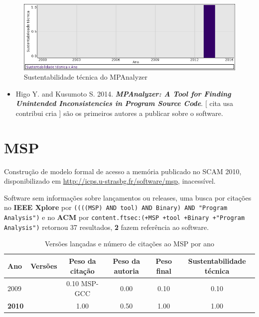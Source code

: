 \begin{figure}[h]
  \center
  \includegraphics[scale=0.50]{result-documents/charts/mpanalyzer.png}
  \caption{Sustentabilidade técnica do MPAnalyzer}
\end{figure}


\begin{itemize}
\item Higo Y. and Kusumoto S.
      2014.
        \textbf{\textit{ MPAnalyzer: A Tool for Finding Unintended Inconsistencies in Program Source Code}}.
      [
          cita
          usa
          contribui
          cria
      ]
são os primeiros autores a publicar sobre o software.
\end{itemize}
\section{MSP}

Construção de modelo formal de acesso a memória
publicado no SCAM 2010,
disponibilizado em \url{http://icps.u-strasbg.fr/software/msp},
inacessível.

Software sem informações sobre lançamentos ou releases,
uma busca por citações no {\bf IEEE Xplore} por
\texttt{((((MSP) AND tool) AND Binary) AND "Program Analysis")}
e no {\bf ACM} por
\texttt{content.ftsec:(+MSP +tool +Binary +"Program Analysis")}
retornou
37 resultados,
{\bf 2} fazem referência ao software.


\begin{table}[H]
\caption{Versões lançadas e número de citações ao MSP por ano}
\centering
\begin{tabular}{| l | c | c | c | c | c |}
  \hline
  Ano & Versões & Peso da citação & Peso da autoria & Peso final & Sustentabilidade técnica \\
  \hline
            2009
          &
          
          &
          0.10
            {\tiny MSP-GCC}
          &
          0.00
          &
          0.10
          &
            {\color{red} 0.10}
          \\
\hline
            {\bf 2010}
          &
          
          &
          1.00
          &
          0.50
          &
          1.00
          &
            {\color{blue} 1.00}
          \\
\hline
\end{tabular}
\end{table}

